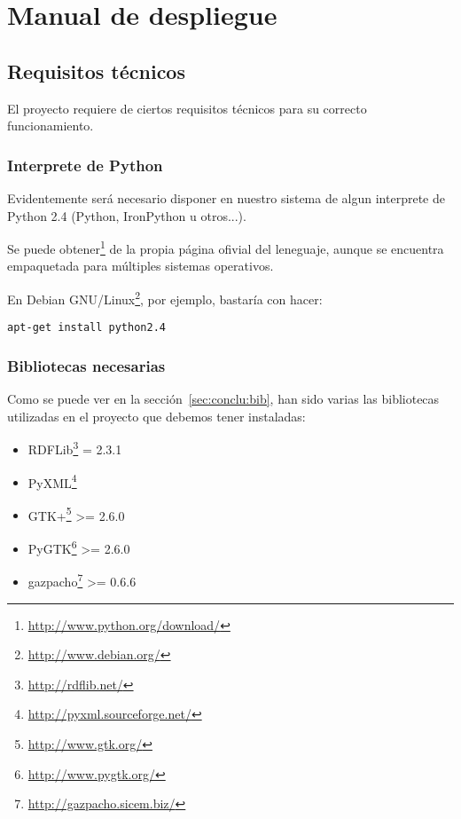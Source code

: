 
\section{Manual de despliegue}

\subsection*{Requisitos técnicos}

El proyecto requiere de ciertos requisitos técnicos para su correcto
funcionamiento.

\subsubsection*{Interprete de Python}

Evidentemente será necesario disponer en nuestro sistema de algun interprete
de Python 2.4 (Python, IronPython u otros...).

Se puede obtener\footnote{\url{http://www.python.org/download/}} de la propia 
página ofivial del leneguaje, aunque se encuentra empaquetada para múltiples
sistemas operativos.

En Debian GNU/Linux\footnote{\url{http://www.debian.org/}}, por ejemplo, bastaría
con hacer:

\begin{center}
	\texttt{apt-get install python2.4}
\end{center}

\subsubsection*{Bibliotecas necesarias}

Como se puede ver en la sección~\ref{sec:conclu:bib}, han sido varias las
bibliotecas utilizadas en el proyecto que debemos tener instaladas:

\begin{itemize}
  \item RDFLib\footnote{\url{http://rdflib.net/}} = 2.3.1
  \item PyXML\footnote{\url{http://pyxml.sourceforge.net/}}
  \item GTK+\footnote{\url{http://www.gtk.org/}} >= 2.6.0
  \item PyGTK\footnote{\url{http://www.pygtk.org/}} >= 2.6.0
  \item gazpacho\footnote{\url{http://gazpacho.sicem.biz/}} >= 0.6.6
\end{itemize}


